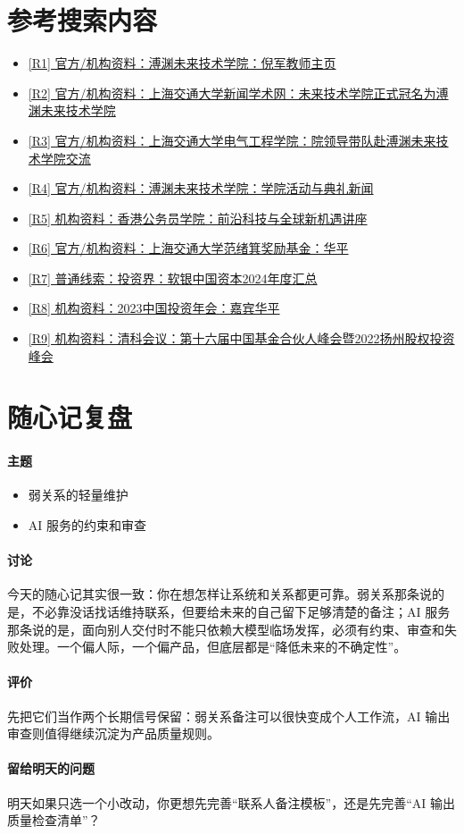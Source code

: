 \documentclass[UTF8,zihao=-4]{ctexart}
\begin{document}
\section*{参考搜索内容}
\begin{itemize}[leftmargin=2em]
\item \href{https://gift.sjtu.edu.cn/faculty/40815}{[R1] 官方/机构资料：溥渊未来技术学院：倪军教师主页}
\item \href{https://news.sjtu.edu.cn/zhxw/20211203/164037.html}{[R2] 官方/机构资料：上海交通大学新闻学术网：未来技术学院正式冠名为溥渊未来技术学院}
\item \href{https://see.sjtu.edu.cn/news/2014.html}{[R3] 官方/机构资料：上海交通大学电气工程学院：院领导带队赴溥渊未来技术学院交流}
\item \href{https://gift.sjtu.edu.cn/news/863}{[R4] 官方/机构资料：溥渊未来技术学院：学院活动与典礼新闻}
\item \href{https://www.csc.gov.hk/sc/news/Executive-Series-on-Brokering-North-and-South-4th-Seminar}{[R5] 机构资料：香港公务员学院：前沿科技与全球新机遇讲座}
\item \href{https://umji.sjtu.edu.cn/fxjscholarship/?p=62}{[R6] 官方/机构资料：上海交通大学范绪箕奖励基金：华平}
\item \href{https://www.pedaily.cn/company/2024/14762/}{[R7] 普通线索：投资界：软银中国资本2024年度汇总}
\item \href{https://www.chinaventure.com.cn/meeting/special/202210/index.html}{[R8] 机构资料：2023中国投资年会：嘉宾华平}
\item \href{https://events.pedaily.cn/cvcf/983/}{[R9] 机构资料：清科会议：第十六届中国基金合伙人峰会暨2022扬州股权投资峰会}
\end{itemize}
\section*{随心记复盘}
\paragraph{主题}
\begin{itemize}[leftmargin=2em]
\item 弱关系的轻量维护
\item AI 服务的约束和审查
\end{itemize}
\paragraph{讨论} 今天的随心记其实很一致：你在想怎样让系统和关系都更可靠。弱关系那条说的是，不必靠没话找话维持联系，但要给未来的自己留下足够清楚的备注；AI 服务那条说的是，面向别人交付时不能只依赖大模型临场发挥，必须有约束、审查和失败处理。一个偏人际，一个偏产品，但底层都是“降低未来的不确定性”。
\paragraph{评价} 先把它们当作两个长期信号保留：弱关系备注可以很快变成个人工作流，AI 输出审查则值得继续沉淀为产品质量规则。
\paragraph{留给明天的问题} 明天如果只选一个小改动，你更想先完善“联系人备注模板”，还是先完善“AI 输出质量检查清单”？
\end{document}
